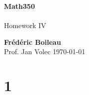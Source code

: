 \documentclass{article}
\begin{document}
	\begin{titlepage}
		\begin{center}
			\vspace*{1cm}
			\textbf{Math350}\\
			\\
			\vspace{0.5cm}
			Homework IV
			
			\vspace{1.5cm}
			
			\textbf{Frédéric Boileau}\\
			\vspace{2cm}
			Prof. 
			Jan Volec
			\vfill
			\today
			\thispagestyle{empty}
		\end{center}
	\end{titlepage}
	\newpage
	\tableofcontents
	\thispagestyle{empty}
	\clearpage
	
	\section*{1}
	
\end{document}
